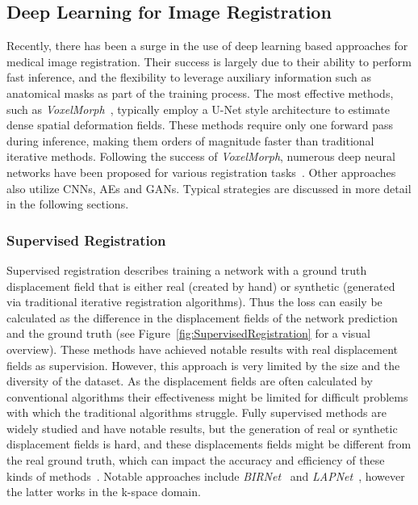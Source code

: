 \documentclass[english,version-2022-01]{uzl-thesis} %
\begin{document}
\subsection{Deep Learning for Image Registration} \label{SubSec:DLImageRegistration}
Recently, there has been a surge in the use of deep learning based approaches for medical image registration. Their success is largely due to their ability to perform fast inference, and the flexibility to leverage auxiliary information such as anatomical masks as part of the training process. The most effective methods, such as \emph{VoxelMorph}~\cite{Voxelmorph}, typically employ a U-Net style architecture to estimate dense spatial deformation fields. These methods require only one forward pass during inference, making them orders of magnitude faster than traditional iterative methods. Following the success of \emph{VoxelMorph}, numerous deep neural networks have been proposed for various registration tasks~\cite{Fourier-Net+}. Other approaches also utilize CNNs, AEs and GANs. Typical strategies are discussed in more detail in the following sections.

\subsubsection{Supervised Registration} \label{SubSubSec:SupervisedRegistration}
Supervised registration describes training a network with a ground truth displacement field that is either real (created by hand) or synthetic (generated via traditional iterative registration algorithms). Thus the loss can easily be calculated as the difference in the displacement fields of the network prediction and the ground truth (see Figure~\ref{fig:SupervisedRegistration} for a visual overview). These methods have achieved notable results with real displacement fields as supervision. However, this approach is very limited by the size and the diversity of the dataset. As the displacement fields are often calculated by conventional algorithms their effectiveness might be limited for difficult problems with which the traditional algorithms struggle. Fully supervised methods are widely studied and have notable results, but the generation of real or synthetic displacement fields is hard, and these displacements fields might be different from the real ground truth, which can impact the accuracy and efficiency of these kinds of methods~\cite{Zou2022}. Notable approaches include \emph{BIRNet}~\cite{BIRNet} and \emph{LAPNet}~\cite{LAPNet}, however the latter works in the k-space domain.
\end{document}
